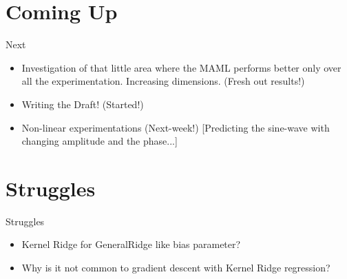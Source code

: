 \documentclass[aspectratio=169]{beamer}
\begin{document}
\section{Coming Up}
\begin{frame}{Next}
  \begin{itemize}
    \item Investigation of that little area where the MAML performs better only over all the experimentation. Increasing dimensions. (Fresh out results!)
    \item Writing the Draft! (Started!)
    \item Non-linear experimentations (Next-week!) [Predicting the sine-wave with changing amplitude and the phase...] 
  \end{itemize}
\end{frame}

\section{Struggles}
\begin{frame}{Struggles}
  \begin{itemize}
    \item Kernel Ridge for GeneralRidge like bias parameter?
    \item Why is it not common to gradient descent with Kernel Ridge regression?
  \end{itemize}
\end{frame}
\end{document}
